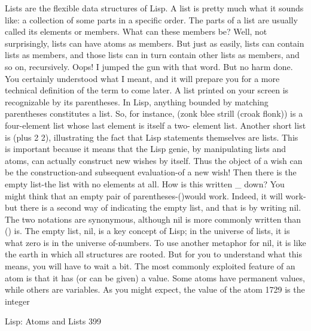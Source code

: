         Lists are the flexible data structures of Lisp. A list is pretty much what it
sounds like: a collection of some parts in a specific order. The parts of a list are
usually called its elements or members. What can these members be? Well, not
surprisingly, lists can have atoms as members. But just as easily, lists can contain lists
as members, and those lists can in turn contain other lists as members, and so on,
recursively. Oops! I jumped the gun with that word. But no harm done. You certainly
understood what I meant, and it will prepare you for a more technical definition of the
term to come later.
        A list printed on your screen is recognizable by its parentheses. In Lisp,
anything bounded by matching parentheses constitutes a list. So, for instance, (zonk
blee strill (croak flonk)) is a four-element list whose last element is itself a two-
element list. Another short list is (plus 2 2), illustrating the fact that Lisp statements
themselves are lists. This is important because it means that the Lisp genie, by
manipulating lists and atoms, can actually construct new wishes by itself. Thus the
object of a wish can be the construction-and subsequent evaluation-of a new wish!
        Then there is the empty list-the list with no elements at all. How is this written
\_ down? You might think that an empty pair of parentheses-()would work. Indeed, it
will work-but there is a second way of indicating the empty list, and that is by writing
nil. The two notations are synonymous, although nil is more commonly written than
() is. The empty list, nil, is a key concept of Lisp; in the universe of lists, it is what
zero is in the universe of-numbers. To use another metaphor for nil, it is like the earth
in which all structures are rooted. But for you to understand what this means, you will
have to wait a bit.
        The most commonly exploited feature of an atom is that it has (or can be
given) a value. Some atoms have permanent values, while others are variables. As you
might expect, the value of the atom 1729 is the integer




Lisp: Atoms and Lists                                                                  399

